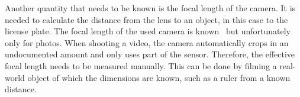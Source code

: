 Another quantity that needs to be known is the focal length of the camera.
It is needed to calculate the distance from the lens to an object, in this case to the license plate.
The focal length of the used camera is known~\cite{AppleInc.2019} but unfortunately only for photos.
When shooting a video, the camera automatically crops in an undocumented amount and only uses part of the sensor.
Therefore, the effective focal length needs to be measured manually.
This can be done by filming a real-world object of which the dimensions are known, such as a ruler from a known distance.
